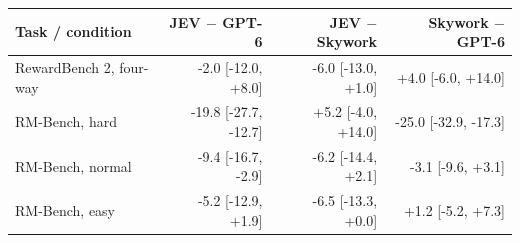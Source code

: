 \begin{tabular}{@{}lrrr@{}}
\toprule
Task / condition & JEV $-$ GPT-6 & JEV $-$ Skywork & Skywork $-$ GPT-6 \\
\midrule
RewardBench 2, four-way & -2.0 [-12.0, +8.0] & -6.0 [-13.0, +1.0] & +4.0 [-6.0, +14.0] \\
RM-Bench, hard & -19.8 [-27.7, -12.7] & +5.2 [-4.0, +14.0] & -25.0 [-32.9, -17.3] \\
RM-Bench, normal & -9.4 [-16.7, -2.9] & -6.2 [-14.4, +2.1] & -3.1 [-9.6, +3.1] \\
RM-Bench, easy & -5.2 [-12.9, +1.9] & -6.5 [-13.3, +0.0] & +1.2 [-5.2, +7.3] \\
\bottomrule
\end{tabular}
